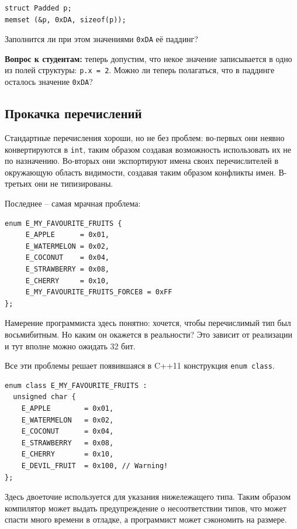 \documentclass[a4paper,12pt,oneside]{book}
\newif\ifanswers
\begin{document}
\begin{lstlisting}
struct Padded p;
memset (&p, 0xDA, sizeof(p));
\end{lstlisting}

Заполнится ли при этом значениями \lstinline!0xDA! её паддинг?

\ifanswers
Верный ответ: да, несомненно.
\fi

\textbf{Вопрос к студентам:} теперь допустим, что некое значение записывается в одно из полей структуры: \lstinline!p.x = 2!. Можно ли теперь полагаться, что в паддинге осталось значение \lstinline!0xDA!?

\ifanswers
Верный ответ: нет, потому что см. выше, при записи в поля, паддинг unspecified.
\fi

\subsection{Прокачка перечислений}\label{EnumClass}

Стандартные перечисления хороши, но не без проблем: во-первых они неявно конвертируются в \lstinline!int!, таким образом создавая возможность использовать их не по назначению. Во-вторых они экспортируют имена своих перечислителей в окружающую область видимости, создавая таким образом конфликты имен. В-третьих они не типизированы.

Последнее -- самая мрачная проблема:

\begin{lstlisting}
enum E_MY_FAVOURITE_FRUITS {
     E_APPLE      = 0x01,
     E_WATERMELON = 0x02,
     E_COCONUT    = 0x04,
     E_STRAWBERRY = 0x08,
     E_CHERRY     = 0x10,
     E_MY_FAVOURITE_FRUITS_FORCE8 = 0xFF
};
\end{lstlisting}

Намерение программиста здесь понятно: хочется, чтобы перечислимый тип был восьмибитным. Но каким он окажется в реальности? Это зависит от реализации и тут вполне можно ожидать 32 бит.

Все эти проблемы решает появившаяся в C++11 конструкция \lstinline!enum class!.

\begin{lstlisting}
enum class E_MY_FAVOURITE_FRUITS : 
  unsigned char {
    E_APPLE        = 0x01,
    E_WATERMELON   = 0x02,
    E_COCONUT      = 0x04,
    E_STRAWBERRY   = 0x08,
    E_CHERRY       = 0x10,
    E_DEVIL_FRUIT  = 0x100, // Warning!
};
\end{lstlisting}

Здесь двоеточие используется для указания нижележащего типа. Таким образом компилятор может выдать предупреждение о несоответствии типов, что может спасти много времени в отладке, а программист может сэкономить на размере. 
\end{document}

